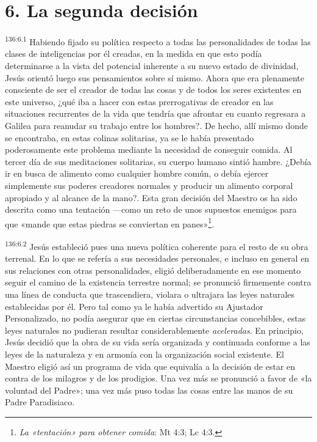 \section*{6. La segunda decisión}
\par 
\textsuperscript{136:6.1} Habiendo fijado su política respecto a todas las personalidades de todas las clases de inteligencias por él creadas, en la medida en que esto podía determinarse a la vista del potencial inherente a su nuevo estado de divinidad, Jesús orientó luego sus pensamientos sobre sí mismo. Ahora que era plenamente consciente de ser el creador de todas las cosas y de todos los seres existentes en este universo, ¿qué iba a hacer con estas prerrogativas de creador en las situaciones recurrentes de la vida que tendría que afrontar en cuanto regresara a Galilea para reanudar su trabajo entre los hombres?. De hecho, allí mismo donde se encontraba, en estas colinas solitarias, ya se le había presentado poderosamente este problema mediante la necesidad de conseguir comida. Al tercer día de sus meditaciones solitarias, su cuerpo humano sintió hambre. ¿Debía ir en busca de alimento como cualquier hombre común, o debía ejercer simplemente sus poderes creadores normales y producir un alimento corporal apropiado y al alcance de la mano?. Esta gran decisión del Maestro os ha sido descrita como una tentación ---como un reto de unos supuestos enemigos para que «mande que estas piedras se conviertan en panes»\footnote{\textit{La «tentación» para obtener comida}: Mt 4:3; Lc 4:3.}.

\par 
\textsuperscript{136:6.2} Jesús estableció pues una nueva política coherente para el resto de su obra terrenal. En lo que se refería a sus necesidades personales, e incluso en general en sus relaciones con otras personalidades, eligió deliberadamente en ese momento seguir el camino de la existencia terrestre normal; se pronunció firmemente contra una línea de conducta que trascendiera, violara o ultrajara las leyes naturales establecidas por él. Pero tal como ya le había advertido su Ajustador Personalizado, no podía asegurar que en ciertas circunstancias concebibles, estas leyes naturales no pudieran resultar considerablemente \textit{aceleradas}. En principio, Jesús decidió que la obra de su vida sería organizada y continuada conforme a las leyes de la naturaleza y en armonía con la organización social existente. El Maestro eligió así un programa de vida que equivalía a la decisión de estar en contra de los milagros y de los prodigios. Una vez más se pronunció a favor de «la voluntad del Padre»; una vez más puso todas las cosas entre las manos de su Padre Paradisiaco.


